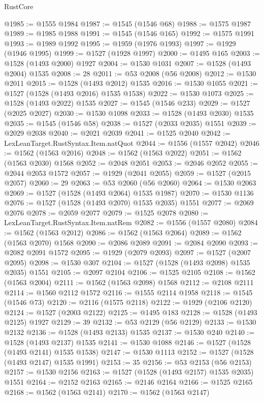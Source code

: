 \begin{lexlean}{RustCore}
\begin{coremodule}
@1985 := @1555 @1984
@1987 := @1545 (@1546 @68)
@1988 := @1575 @1987
@1989 := @1985 @1988
@1991 := @1545 (@1546 @165)
@1992 := @1575 @1991
@1993 := @1989 @1992
@1995 := @1959 (@1976 @1993)
@1997 := @1929 (@1946 @1995)
@1999 := @1527 (@1928 @1997)
@2000 := @1495 @165
@2003 := @1528 (@1493 @2000) @1927
@2004 := @1530 @1031
@2007 := @1528 (@1493 @2004) @1535
@2008 := 28
@2011 := @53 @2008 (@56 @2008)
@2012 := @1530 @2011
@2015 := @1528 (@1493 @2012) @1535
@2016 := @1530 @1055
@2021 := @1527 (@1528 (@1493 @2016) @1535 @1538)
@2022 := @1530 @1073
@2025 := @1528 (@1493 @2022) @1535
@2027 := @1545 (@1546 @233)
@2029 := @1527 (@2025 @2027)
@2030 := @1530 @1098
@2033 := @1528 (@1493 @2030) @1535
@2035 := @1545 (@1546 @58)
@2038 := @1527 (@2033 @2035) @1551
@2039 := @2029 @2038
@2040 := @2021 @2039
@2041 := @1525 @2040
@2042 := LexLeanTarget.RustSyntax.Item.natQuot
@2044 := @1556 (@1557 @2042)
@2046 := @1562 (@1563 @2016)
@2048 := @1562 (@1563 @2022)
@2051 := @1562 (@1563 @2030) @1568
@2052 := @2048 @2051
@2053 := @2046 @2052
@2055 := @2044 @2053 @1572
@2057 := @1929 (@2041 @2055)
@2059 := @1527 (@2015 @2057)
@2060 := 29
@2063 := @53 @2060 (@56 @2060)
@2064 := @1530 @2063
@2069 := @1527 (@1528 (@1493 @2064) @1535 @1987)
@2070 := @1530 @1136
@2076 := @1527 (@1528 (@1493 @2070) @1535 @2035) @1551
@2077 := @2069 @2076
@2078 := @2059 @2077
@2079 := @1525 @2078
@2080 := LexLeanTarget.RustSyntax.Item.natRem
@2082 := @1556 (@1557 @2080)
@2084 := @1562 (@1563 @2012)
@2086 := @1562 (@1563 @2064)
@2089 := @1562 (@1563 @2070) @1568
@2090 := @2086 @2089
@2091 := @2084 @2090
@2093 := @2082 @2091 @1572
@2095 := @1929 (@2079 @2093)
@2097 := @1527 (@2007 @2095)
@2098 := @1530 @307
@2104 := @1527 (@1528 (@1493 @2098) @1535 @2035) @1551
@2105 := @2097 @2104
@2106 := @1525 @2105
@2108 := @1562 (@1563 @2004)
@2111 := @1562 (@1563 @2098) @1568
@2112 := @2108 @2111
@2114 := @1560 @2112 @1572
@2116 := @1555 @2114 @1958
@2118 := @1545 (@1546 @73)
@2120 := @2116 (@1575 @2118)
@2122 := @1929 (@2106 @2120)
@2124 := @1527 (@2003 @2122)
@2125 := @1495 @183
@2128 := @1528 (@1493 @2125) @1927
@2129 := 39
@2132 := @53 @2129 (@56 @2129)
@2133 := @1530 @2132
@2136 := @1528 (@1493 @2133) @1535
@2137 := @1530 @240
@2140 := @1528 (@1493 @2137) @1535
@2141 := @1530 @1088
@2146 := @1527 (@1528 (@1493 @2141) @1535 @1538)
@2147 := @1530 @1113
@2152 := @1527 (@1528 (@1493 @2147) @1535 @1991)
@2153 := 35
@2156 := @53 @2153 (@56 @2153)
@2157 := @1530 @2156
@2163 := @1527 (@1528 (@1493 @2157) @1535 @2035) @1551
@2164 := @2152 @2163
@2165 := @2146 @2164
@2166 := @1525 @2165
@2168 := @1562 (@1563 @2141)
@2170 := @1562 (@1563 @2147)

\end{coremodule}
\end{lexlean}
